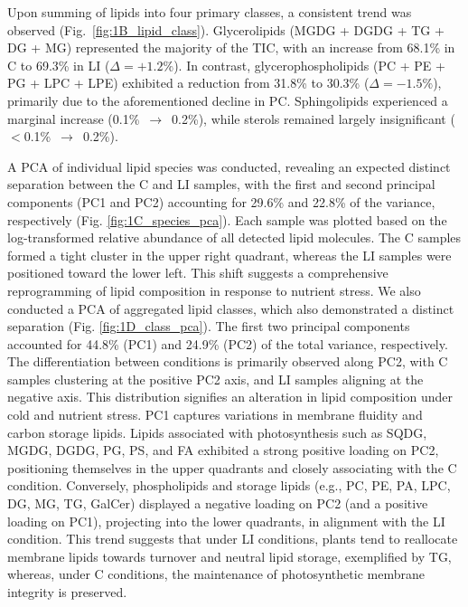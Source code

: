 \documentclass[10pt,letterpaper]{article}
\begin{document}
Upon summing of lipids into four primary classes, a consistent trend was observed (Fig.~\ref{fig:1B_lipid_class}). Glycerolipids (MGDG + DGDG + TG + DG + MG) represented the majority of the TIC, with an increase from 68.1\% in C to 69.3\% in LI (\(\Delta = +1.2\%\)). In contrast, glycerophospholipids (PC + PE + PG + LPC + LPE) exhibited a reduction from 31.8\% to 30.3\% (\(\Delta = -1.5\%\)), primarily due to the aforementioned decline in PC. Sphingolipids experienced a marginal increase (0.1\%~\(\rightarrow\)~0.2\%), while sterols remained largely insignificant ($<$0.1\%~\(\rightarrow\)~0.2\%).

A PCA of individual lipid species was conducted, revealing an expected distinct separation between the C and LI samples, with the first and second principal components (PC1 and PC2) accounting for 29.6\% and 22.8\% of the variance, respectively (Fig. \ref{fig:1C_species_pca}). Each sample was plotted based on the log-transformed relative abundance of all detected lipid molecules. The C samples formed a tight cluster in the upper right quadrant, whereas the LI samples were positioned toward the lower left. This shift suggests a comprehensive reprogramming of lipid composition in response to nutrient stress. We also conducted a PCA of aggregated lipid classes, which also demonstrated a distinct separation (Fig. \ref{fig:1D_class_pca}). The first two principal components accounted for 44.8\% (PC1) and 24.9\% (PC2) of the total variance, respectively. The differentiation between conditions is primarily observed along PC2, with C samples clustering at the positive PC2 axis, and LI samples aligning at the negative axis. This distribution signifies an alteration in lipid composition under cold and nutrient stress. PC1 captures variations in membrane fluidity and carbon storage lipids. Lipids associated with photosynthesis such as SQDG, MGDG, DGDG, PG, PS, and FA exhibited a strong positive loading on PC2, positioning themselves in the upper quadrants and closely associating with the C condition. Conversely, phospholipids and storage lipids (e.g., PC, PE, PA, LPC, DG, MG, TG, GalCer) displayed a negative loading on PC2 (and a positive loading on PC1), projecting into the lower quadrants, in alignment with the LI condition. This trend suggests that under LI conditions, plants tend to reallocate membrane lipids towards turnover and neutral lipid storage, exemplified by TG, whereas, under C conditions, the maintenance of photosynthetic membrane integrity is preserved.
\end{document}
